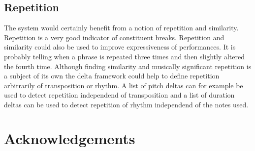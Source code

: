 \documentclass[a4paper,10pt]{article}
\begin{document}
\subsection{Repetition}
The system would certainly benefit from a notion of repetition and similarity. Repetition is a very good indicator of constituent breaks. Repetition and similarity could also be used to improve expressiveness of performances. It is probably telling when a phrase is repeated three times and then slightly altered the fourth time. Although finding similarity and musically significant repetition is a subject of its own the delta framework could help to define repetition arbitrarily of transposition or rhythm. A list of pitch deltas can for example be used to detect repetition independend of transposition and a list of duration deltas can be used to detect repetition of rhythm independend of the notes used. 

\section{Acknowledgements}

  
 
 
\end{document}
